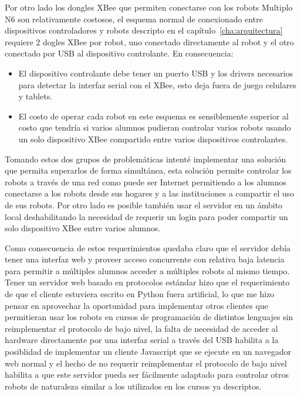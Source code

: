 Por otro lado los dongles XBee que permiten conectarse con los robots
Multiplo N6
son relativamente costosos, el esquema normal de conexionado entre dispositivos
controladores y robots descripto en el capítulo~\ref{cha:arquitectura} requiere
2 dogles XBee por robot, uno conectado directamente al robot y el otro
conectado por USB al dispositivo controlante. En consecuencia:
\begin{itemize}
    \item El dispositivo controlante debe tener un puerto USB y los drivers
        necesarios para detectar la interfaz serial con el XBee, esto deja
        fuera de juego celulares y tablets.
    \item El costo de operar cada robot en este esquema es sensiblemente
        superior al costo que tendría si varios alumnos pudieran
        controlar varios robots usando un solo dispositivo XBee compartido
        entre varios dispositivos controlantes.
\end{itemize}

Tomando estos dos grupos de problemáticas intenté implementar una solución
que permita
superarlos de forma simultánea, esta solución permite controlar los
robots a través de una red como puede ser Internet permitiendo a los alumnos
conectarse a los robots desde sus hogares y a las instituciones a compartir
el uso de sus robots. Por otro lado es posible también usar el servidor
en un ámbito local deshabilitando la necesidad de requerir un login
para poder compartir un solo dispositivo XBee entre varios alumnos.

Como consecuencia de estos requerimientos quedaba claro que el servidor
debía tener una interfaz web y proveer acceso concurrente con relativa
baja latencia para permitir a múltiples alumnos acceder a múltiples robots
al mismo tiempo. Tener un servidor web basado en protocolos estándar hizo
que el requerimiento de que el cliente estuviera escrito en Python fuera
artificial, lo que me hizo pensar en aprovechar la oportunidad para
implementar otros clientes que permitieran usar los robots en cursos
de programación de distintos lenguajes sin reimplementar el protocolo
de bajo nivel, la falta de necesidad de acceder al hardware directamente
por una interfaz serial a través del USB habilita a la posiblidad de
implementar un cliente Javascript que se ejecute en un navegador web
normal y el hecho de no requerir reimplementar el protocolo de bajo nivel
habilita a que este servidor pueda ser fácilmente adaptado para controlar
otros robots de naturaleza similar a los utilizados en los cursos ya
descriptos.

